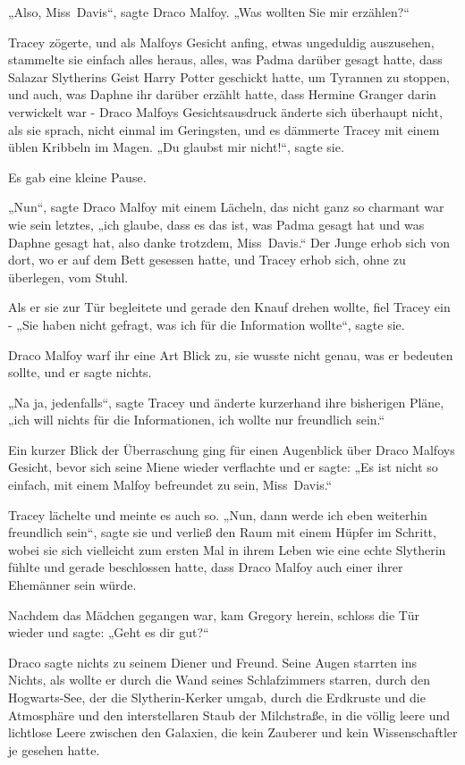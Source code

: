 {„Also, Miss~Davis“, sagte Draco Malfoy. „Was wollten Sie mir erzählen?“

Tracey zögerte, und als Malfoys Gesicht anfing, etwas ungeduldig auszusehen, stammelte sie einfach alles heraus, alles, was Padma darüber gesagt hatte, dass Salazar Slytherins Geist Harry Potter geschickt hatte, um Tyrannen zu stoppen, und auch, was Daphne ihr darüber erzählt hatte, dass Hermine Granger darin verwickelt war - Draco Malfoys Gesichtsausdruck änderte sich überhaupt nicht, als sie sprach, nicht einmal im Geringsten, und es dämmerte Tracey mit einem üblen Kribbeln im Magen. „Du glaubst mir nicht!“, sagte sie.

Es gab eine kleine Pause.

„Nun“, sagte Draco Malfoy mit einem Lächeln, das nicht ganz so charmant war wie sein letztes, „ich glaube, dass es das ist, was Padma gesagt hat und was Daphne gesagt hat, also danke trotzdem, Miss~Davis.“ Der Junge erhob sich von dort, wo er auf dem Bett gesessen hatte, und Tracey erhob sich, ohne zu überlegen, vom Stuhl.

Als er sie zur Tür begleitete und gerade den Knauf drehen wollte, fiel Tracey ein - „Sie haben nicht gefragt, was ich für die Information wollte“, sagte sie.

Draco Malfoy warf ihr eine Art Blick zu, sie wusste nicht genau, was er bedeuten sollte, und er sagte nichts.

„Na ja, jedenfalls“, sagte Tracey und änderte kurzerhand ihre bisherigen Pläne, „ich will nichts für die Informationen, ich wollte nur freundlich sein.“

Ein kurzer Blick der Überraschung ging für einen Augenblick über Draco Malfoys Gesicht, bevor sich seine Miene wieder verflachte und er sagte: „Es ist nicht so einfach, mit einem Malfoy befreundet zu sein, Miss~Davis.“

Tracey lächelte und meinte es auch so. „Nun, dann werde ich eben weiterhin freundlich sein“, sagte sie und verließ den Raum mit einem Hüpfer im Schritt, wobei sie sich vielleicht zum ersten Mal in ihrem Leben wie eine echte Slytherin fühlte und gerade beschlossen hatte, dass Draco Malfoy auch einer ihrer Ehemänner sein würde.

Nachdem das Mädchen gegangen war, kam Gregory herein, schloss die Tür wieder und sagte: „Geht es dir gut?“

Draco sagte nichts zu seinem Diener und Freund. Seine Augen starrten ins Nichts, als wollte er durch die Wand seines Schlafzimmers starren, durch den Hogwarts-See, der die Slytherin-Kerker umgab, durch die Erdkruste und die Atmosphäre und den interstellaren Staub der Milchstraße, in die völlig leere und lichtlose Leere zwischen den Galaxien, die kein Zauberer und kein Wissenschaftler je gesehen hatte.

}
